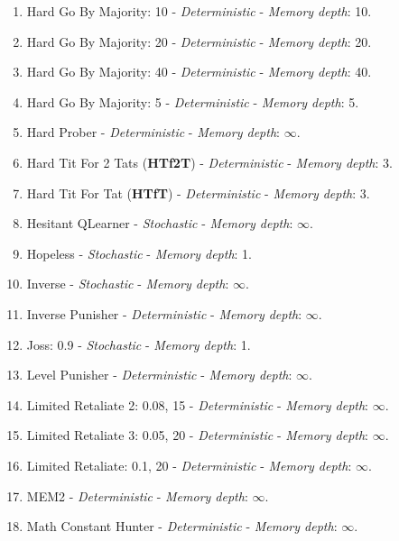 \documentclass[10pt,letterpaper]{article}
\begin{document}
\begin{enumerate}
\item Hard Go By Majority: 10 - \textit{Deterministic} - \textit{Memory depth}: 10. \cite{axelrodproject}
\item Hard Go By Majority: 20 - \textit{Deterministic} - \textit{Memory depth}: 20. \cite{axelrodproject}
\item Hard Go By Majority: 40 - \textit{Deterministic} - \textit{Memory depth}: 40. \cite{axelrodproject}
\item Hard Go By Majority: 5 - \textit{Deterministic} - \textit{Memory depth}: 5. \cite{axelrodproject}
\item Hard Prober - \textit{Deterministic} - \textit{Memory depth}: \(\infty\). \cite{Prison1998}
\item Hard Tit For 2 Tats (\textbf{HTf2T}) - \textit{Deterministic} - \textit{Memory depth}: 3. \cite{Stewart2012}
\item Hard Tit For Tat (\textbf{HTfT}) - \textit{Deterministic} - \textit{Memory depth}: 3. \cite{PD2017}
\item Hesitant QLearner - \textit{Stochastic} - \textit{Memory depth}: \(\infty\). \cite{axelrodproject}
\item Hopeless - \textit{Stochastic} - \textit{Memory depth}: 1. \cite{Berg2015}
\item Inverse - \textit{Stochastic} - \textit{Memory depth}: \(\infty\). \cite{axelrodproject}
\item Inverse Punisher - \textit{Deterministic} - \textit{Memory depth}: \(\infty\). \cite{axelrodproject}
\item Joss: 0.9 - \textit{Stochastic} - \textit{Memory depth}: 1. \cite{Axelrod1980, Stewart2012}
\item Level Punisher - \textit{Deterministic} - \textit{Memory depth}: \(\infty\). \cite{Eckhart2015}
\item Limited Retaliate 2: 0.08, 15 - \textit{Deterministic} - \textit{Memory depth}: \(\infty\). \cite{axelrodproject}
\item Limited Retaliate 3: 0.05, 20 - \textit{Deterministic} - \textit{Memory depth}: \(\infty\). \cite{axelrodproject}
\item Limited Retaliate: 0.1, 20 - \textit{Deterministic} - \textit{Memory depth}: \(\infty\). \cite{axelrodproject}
\item MEM2 - \textit{Deterministic} - \textit{Memory depth}: \(\infty\). \cite{Li2014}
\item Math Constant Hunter - \textit{Deterministic} - \textit{Memory depth}: \(\infty\). \cite{axelrodproject}

\end{enumerate}
\end{document}
